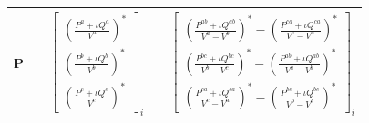\documentclass[10pt,journal]{article}
\begin{document}
\begin{table}[h]
\begin{adjustbox}{width=1\textwidth}
\begin{tabular}{ccccc}
P   &&  $ \begin{bmatrix} 
   (\frac{ P^a +\iota Q^a}{V^a})^*\\
    (\frac{ P^b +\iota Q^b}{V^b})^*\\
    (\frac{ P^c +\iota Q^c}{V^c})^*
    \end{bmatrix}_i $ &&   $  \begin{bmatrix}
   (\frac{ P^{ab} +\iota Q^{ab}}{V^a-V^b})^* - (\frac{ P^{ca} +\iota Q^{ca}}{V^c-V^a})^* \\
    (\frac{ P^{bc} +\iota Q^{bc}}{V^b-V^c})^* - (\frac{ P^{ab} +\iota Q^{ab}}{V^a-V^b})^*\\
    (\frac{ P^{ca} +\iota Q^{ca}}{V^c-V^a})^* - (\frac{ P^{bc} +\iota Q^{bc}}{V^b-V^c})^*
    \end{bmatrix}_i $ \\

\bottomrule
\end{tabular}
\end{adjustbox}
\end{table}
\end{document}
